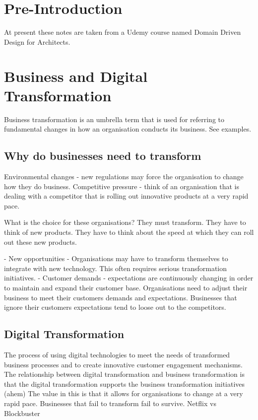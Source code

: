 

\section{Pre-Introduction}
At present these notes are taken from a Udemy course named Domain Driven Design for Architects.


\section{Business and Digital Transformation}
Business transformation is an umbrella term that is used for referring to fundamental changes in how an organisation conducts its business.
See examples.

\subsection{Why do businesses need to transform}
\begin{itemize}
    Environmental changes - new regulations may force the organisation to change how they do business.
    Competitive pressure - think of an organisation that is dealing with a competitor that is rolling out innovative products at a very rapid pace.
\end{itemize}

What is the choice for these organisations?
They must transform.
They have to think of new products.
They have to think about the speed at which they can roll out these new products.

- New opportunities - Organisations may have to transform themselves to integrate with new technology.
This often requires serious transformation initiatives.
- Customer demands - expectations are continuously changing in order to maintain and expand their customer base.
Organisations need to adjust their business to meet their customers demands and expectations.
Businesses that ignore their customers expectations tend to loose out to the competitors.

\subsection{Digital Transformation}
The process of using digital technologies to meet the needs of transformed business processes and to create innovative customer engagement mechanisms.
The relationship between digital transformation and business transformation is that the digital transformation supports the business transformation initiatives (ahem)
The value in this is that it allows for organisations to change at a very rapid pace.
Businesses that fail to transform fail to survive.
Netflix vs Blockbuster

